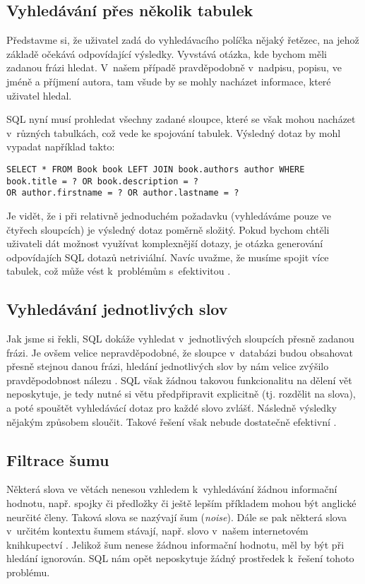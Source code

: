 \documentclass[11pt,oneside]{fithesis2}
\begin{document}
\subsection{Vyhledávání přes několik tabulek}
Představme si, že uživatel zadá do vyhledávacího políčka nějaký řetězec, na jehož základě očekává odpovídající výsledky. Vyvstává otázka, kde bychom měli zadanou frázi hledat. V~našem případě
pravděpodobně v~nadpisu, popisu, ve jméně a příjmení autora, tam všude by se mohly nacházet informace, které uživatel hledal. 

SQL nyní musí prohledat všechny zadané sloupce, které se však mohou nacházet v~různých tabulkách, což vede ke spojování tabulek. Výsledný dotaz by mohl vypadat například takto:
\begin{verbatim}
SELECT * FROM Book book LEFT JOIN book.authors author WHERE 
book.title = ? OR book.description = ? 
OR author.firstname = ? OR author.lastname = ?
\end{verbatim}

Je vidět, že i při relativně jednoduchém požadavku (vyhledáváme pouze ve čtyřech sloupcích) je výsledný dotaz poměrně složitý. Pokud bychom chtěli uživateli dát možnost využívat komplexnější
dotazy, je otázka generování odpovídajích SQL dotazů netriviální. Navíc uvažme, že musíme spojit více tabulek, což může vést k~problémům s~efektivitou \cite[s.~9]{HibernateSearchAction}.

\subsection{Vyhledávání jednotlivých slov}
Jak jsme si řekli, SQL dokáže vyhledat v~jednotlivých sloupcích přesně zadanou frázi. Je ovšem velice nepravděpodobné, že sloupce v~databázi budou obsahovat přesně stejnou danou frázi, 
hledání jednotlivých slov by nám velice zvýšilo pravděpodobnost nálezu \cite[s.~9]{HibernateSearchAction}. SQL však žádnou takovou funkcionalitu na dělení vět neposkytuje, je tedy nutné si větu předpřipravit explicitně (tj. rozdělit na slova),
a poté spouštět vyhledávácí dotaz pro každé slovo zvlášť. Následně výsledky nějakým způsobem sloučit. Takové řešení však nebude dostatečně efektivní \cite[s.~10]{HibernateSearchAction}. 

\subsection{Filtrace šumu}
Některá slova ve větách nenesou vzhledem k~vyhledávání žádnou informační hodnotu, např. spojky či předložky či ještě lepším příkladem mohou být anglické neurčité členy. Taková slova se nazývají šum (\emph{noise}). Dále se pak některá slova v~určitém kontextu
šumem stávají, např. slovo  v~našem internetovém knihkupectví \cite[s.~9]{HibernateSearchAction}. Jelikož šum nenese žádnou informační hodnotu, měl by být při hledání ignorován. SQL nám opět neposkytuje žádný prostředek k~řešení tohoto problému.
\end{document}

